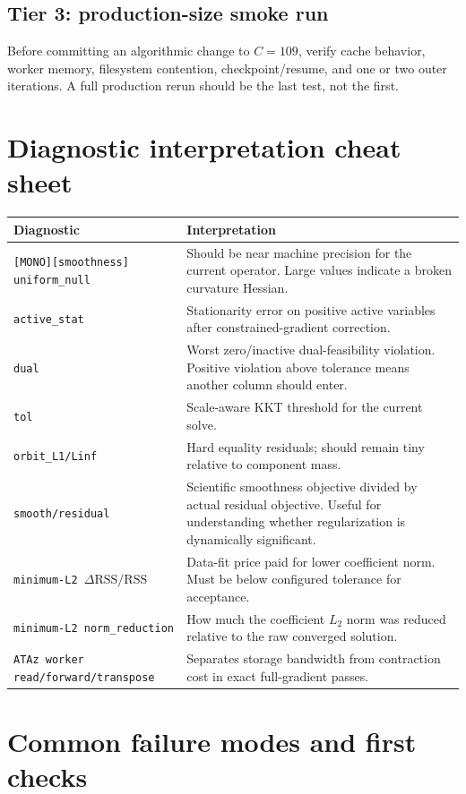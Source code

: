 \documentclass[10pt,a4paper]{article}
\newcommand{\code}[1]{\texttt{#1}}
\begin{document}
\subsection{Tier 3: production-size smoke run}
Before committing an algorithmic change to $C=109$, verify cache behavior, worker memory, filesystem contention, checkpoint/resume, and one or two outer iterations. A full production rerun should be the last test, not the first.

\section{Diagnostic interpretation cheat sheet}
\begin{longtable}{p{}p{}}
\toprule
\textbf{Diagnostic} & \textbf{Interpretation}\\
\midrule\endhead
\code{[MONO][smoothness] uniform\_null} & Should be near machine precision for the current operator. Large values indicate a broken curvature Hessian.\\
\code{active\_stat} & Stationarity error on positive active variables after constrained-gradient correction.\\
\code{dual} & Worst zero/inactive dual-feasibility violation. Positive violation above tolerance means another column should enter.\\
\code{tol} & Scale-aware KKT threshold for the current solve.\\
\code{orbit\_L1/Linf} & Hard equality residuals; should remain tiny relative to component mass.\\
\code{smooth/residual} & Scientific smoothness objective divided by actual residual objective. Useful for understanding whether regularization is dynamically significant.\\
\code{minimum-L2 $\Delta\mathrm{RSS}/\mathrm{RSS}$} & Data-fit price paid for lower coefficient norm. Must be below configured tolerance for acceptance.\\
\code{minimum-L2 norm\_reduction} & How much the coefficient $L_2$ norm was reduced relative to the raw converged solution.\\
\code{ATAz worker read/forward/transpose} & Separates storage bandwidth from contraction cost in exact full-gradient passes.\\
\bottomrule
\end{longtable}

\section{Common failure modes and first checks}
\end{document}
